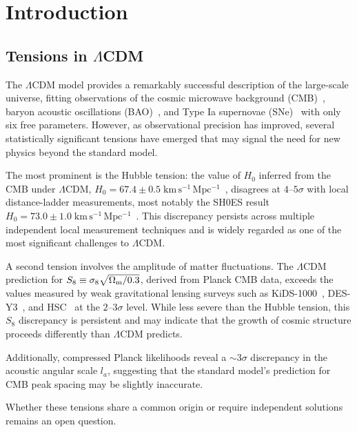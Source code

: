 \documentclass[aps,prd,twocolumn,superscriptaddress,nofootinbib]{revtex4-2}
\newcommand{\LCDM}{$\Lambda$CDM}
\newcommand{\Om}{\Omega_{\rm m}}
\begin{document}
\section{Introduction}
\label{sec:intro}

\subsection{Tensions in \LCDM}

The $\Lambda$CDM model provides a remarkably successful description of the 
large-scale universe, fitting observations of the cosmic microwave 
background (CMB)~\cite{Planck2018}, baryon acoustic oscillations 
(BAO)~\cite{BOSS2017}, and Type Ia supernovae (SNe)~\cite{Pantheon2022} 
with only six free parameters. However, as observational precision has 
improved, several statistically significant tensions have emerged that may 
signal the need for new physics beyond the standard model.

The most prominent is the Hubble tension: the value of $H_0$ inferred from 
the CMB under $\Lambda$CDM, $H_0 = 67.4 \pm 0.5\;\mathrm{km\,s^{-1}\,
Mpc^{-1}}$~\cite{Planck2018}, disagrees at $4$--$5\sigma$ with local 
distance-ladder measurements, most notably the SH0ES result $H_0 = 73.0 
\pm 1.0\;\mathrm{km\,s^{-1}\,Mpc^{-1}}$~\cite{Riess2022}. This 
discrepancy persists across multiple independent local measurement 
techniques and is widely regarded as one of the most significant 
challenges to $\Lambda$CDM.

A second tension involves the amplitude of matter fluctuations. The 
$\Lambda$CDM prediction for $S_8 \equiv \sigma_8\sqrt{\Om/0.3}$, derived 
from Planck CMB data, exceeds the values measured by weak gravitational 
lensing surveys such as KiDS-1000~\cite{KiDS2021}, DES-Y3~\cite{DES2022}, 
and HSC~\cite{HSC2020} at the $2$--$3\sigma$ level. While less severe than 
the Hubble tension, this $S_8$ discrepancy is persistent and may indicate 
that the growth of cosmic structure proceeds differently than $\Lambda$CDM 
predicts.

Additionally, compressed Planck likelihoods reveal a $\sim 3\sigma$ 
discrepancy in the acoustic angular scale $l_a$, suggesting that the 
standard model's prediction for CMB peak spacing may be slightly 
inaccurate.

Whether these tensions share a common origin or require independent 
solutions remains an open question.
\end{document}
